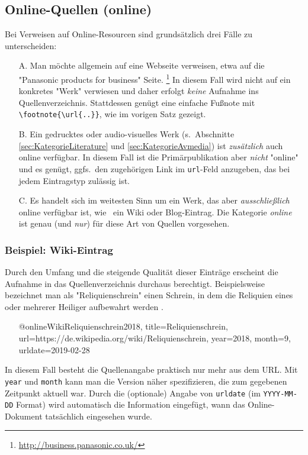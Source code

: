 \subsection{Online-Quellen (\textsf{online})}
\label{sec:KategorieOnline}

Bei Verweisen auf Online-Resourcen sind grundsätzlich drei Fälle zu unterscheiden:
%
\begin{itemize}
\item[A.] Man möchte allgemein auf eine Webseite verweisen, etwa auf die 
	"Panasonic products for business" Seite.%
	\footnote{\url{http://business.panasonic.co.uk/}}
	In diesem Fall wird nicht auf ein konkretes "Werk" verwiesen und daher
	erfolgt \emph{keine} Aufnahme ins Quellenverzeichnis. Stattdessen
	genügt eine einfache Fußnote mit \verb!\footnote{\url{..}}!, wie im vorigen
	Satz gezeigt.
\item[B.] Ein gedrucktes oder audio-visuelles Werk 
	(s.\ Abschnitte \ref{sec:KategorieLiterature} und \ref{sec:KategorieAvmedia})
	ist \emph{zusätzlich} auch online verfügbar. In diesem Fall ist die Primär\-publikation 
	aber \emph{nicht} "online" und es genügt, ggfs.\ den zugehörigen Link im 
	\texttt{url}-Feld anzugeben, das bei jedem Eintragstyp zulässig ist.
\item[C.] Es handelt sich im weitesten Sinn um ein Werk, das aber 
	\emph{ausschließlich} online verfügbar ist, wie \zB\ ein Wiki oder Blog-Eintrag.
	Die Kategorie \emph{online} ist genau (und \emph{nur}) für diese 
	Art von Quellen vorgesehen.
\end{itemize}


\subsubsection{Beispiel: Wiki-Eintrag}
\label{sec:@online-www}
Durch den Umfang und die steigende Qualität dieser Einträge erscheint
die Aufnahme in das Quellenverzeichnis durchaus berechtigt.
Beispielsweise bezeichnet man als "Reliquienschrein"
einen Schrein, in dem die Reliquien eines oder 
mehrerer Heiliger aufbewahrt werden \cite{WikiReliquienschrein2018}.
%
\begin{itemize}
\item[]
\begin{GenericCode}[numbers=none]
@online{WikiReliquienschrein2018,
	title={Reliquienschrein},
	url={https://de.wikipedia.org/wiki/Reliquienschrein},
	year={2018},
	month={9},
	urldate={2019-02-28}
}
\end{GenericCode}
\item[\cite{WikiReliquienschrein2018}] 
\end{itemize}
%
In diesem Fall besteht die Quellenangabe praktisch nur mehr aus dem URL.
Mit \texttt{year} und \texttt{month} kann man die Version näher spezifizieren, 
die zum gegebenen Zeitpunkt aktuell war.
Durch die (optionale) Angabe von \texttt{urldate} (im \texttt{YYYY-MM-DD} Format) wird automatisch 
die Information eingefügt, wann das Online-Dokument tatsächlich eingesehen wurde.




